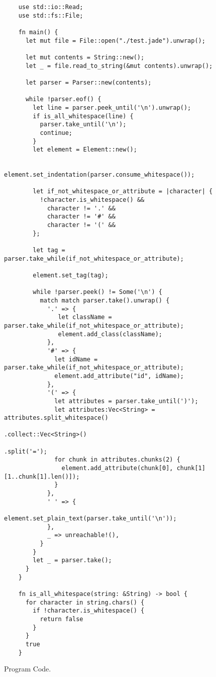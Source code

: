 \begin{figure}
  \begin{verbatim}
    use std::io::Read;
    use std::fs::File;

    fn main() {
      let mut file = File::open("./test.jade").unwrap();

      let mut contents = String::new();
      let _ = file.read_to_string(&mut contents).unwrap();

      let parser = Parser::new(contents);

      while !parser.eof() {
        let line = parser.peek_until('\n').unwrap();
        if is_all_whitespace(line) {
          parser.take_until('\n');
          continue;
        }
        let element = Element::new();

        element.set_indentation(parser.consume_whitespace());

        let if_not_whitespace_or_attribute = |character| {
          !character.is_whitespace() && 
            character != '.' &&
            character != '#' &&
            character != '(' &&
        };

        let tag = parser.take_while(if_not_whitespace_or_attribute);

        element.set_tag(tag);

        while !parser.peek() != Some('\n') {
          match match parser.take().unwrap() {
            '.' => {
               let className = parser.take_while(if_not_whitespace_or_attribute);
               element.add_class(className);
            },
            '#' => {
              let idName = parser.take_while(if_not_whitespace_or_attribute);
              element.add_attribute("id", idName);
            },
            '(' => {
              let attributes = parser.take_until(')');
              let attributes:Vec<String> = attributes.split_whitespace()
                                                     .collect::Vec<String>()
                                                     .split('=');
              for chunk in attributes.chunks(2) {
                element.add_attribute(chunk[0], chunk[1][1..chunk[1].len()]);
              }
            },
            ' ' => {
              element.set_plain_text(parser.take_until('\n'));
            },
            _ => unreachable!(),
          }
        }
        let _ = parser.take();
      }
    }

    fn is_all_whitespace(string: &String) -> bool {
      for character in string.chars() {
        if !character.is_whitespace() {
          return false
        }
      }
      true
    }
  \end{verbatim}
  \caption{Program Code.}
\end{figure}
